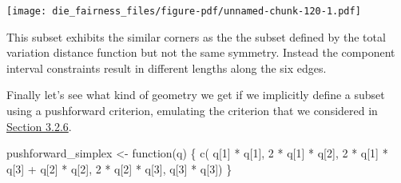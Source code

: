 \documentclass[
  letterpaper,
  DIV=11,
  numbers=noendperiod]{scrartcl}
\newenvironment{Shaded}{\begin{snugshade}}{\end{snugshade}}
\newcommand{\ControlFlowTok}[1]{\textcolor[rgb]{0.00,0.23,0.31}{#1}}
\newcommand{\DecValTok}[1]{\textcolor[rgb]{0.68,0.00,0.00}{#1}}
\newcommand{\FunctionTok}[1]{\textcolor[rgb]{0.28,0.35,0.67}{#1}}
\newcommand{\NormalTok}[1]{\textcolor[rgb]{0.00,0.23,0.31}{#1}}
\newcommand{\OtherTok}[1]{\textcolor[rgb]{0.00,0.23,0.31}{#1}}
\newcommand{\SpecialCharTok}[1]{\textcolor[rgb]{0.37,0.37,0.37}{#1}}
\begin{document}
\texttt{[image: die\_fairness\_files/figure-pdf/unnamed-chunk-120-1.pdf]}

This subset exhibits the similar corners as the the subset defined by
the total variation distance function but not the same symmetry. Instead
the component interval constraints result in different lengths along the
six edges.

Finally let's see what kind of geometry we get if we implicitly define a
subset using a pushforward criterion, emulating the criterion that we
considered in \hyperref[sec:effective_pushforward]{Section 3.2.6}.

\begin{Shaded}
\begin{Highlighting}[]
\NormalTok{pushforward\_simplex }\OtherTok{\textless{}{-}} \ControlFlowTok{function}\NormalTok{(q) \{}
  \FunctionTok{c}\NormalTok{(    q[}\DecValTok{1}\NormalTok{] }\SpecialCharTok{*}\NormalTok{ q[}\DecValTok{1}\NormalTok{],}
    \DecValTok{2} \SpecialCharTok{*}\NormalTok{ q[}\DecValTok{1}\NormalTok{] }\SpecialCharTok{*}\NormalTok{ q[}\DecValTok{2}\NormalTok{],}
    \DecValTok{2} \SpecialCharTok{*}\NormalTok{ q[}\DecValTok{1}\NormalTok{] }\SpecialCharTok{*}\NormalTok{ q[}\DecValTok{3}\NormalTok{] }\SpecialCharTok{+}\NormalTok{ q[}\DecValTok{2}\NormalTok{] }\SpecialCharTok{*}\NormalTok{ q[}\DecValTok{2}\NormalTok{],}
    \DecValTok{2} \SpecialCharTok{*}\NormalTok{ q[}\DecValTok{2}\NormalTok{] }\SpecialCharTok{*}\NormalTok{ q[}\DecValTok{3}\NormalTok{],}
\NormalTok{        q[}\DecValTok{3}\NormalTok{] }\SpecialCharTok{*}\NormalTok{ q[}\DecValTok{3}\NormalTok{])}
\NormalTok{\}}
\end{Highlighting}
\end{Shaded}
\end{document}
